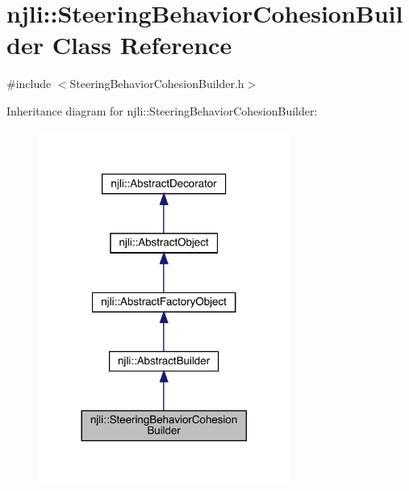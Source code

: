 \hypertarget{classnjli_1_1_steering_behavior_cohesion_builder}{}\section{njli\+:\+:Steering\+Behavior\+Cohesion\+Builder Class Reference}
\label{classnjli_1_1_steering_behavior_cohesion_builder}


{\ttfamily \#include $<$Steering\+Behavior\+Cohesion\+Builder.\+h$>$}



Inheritance diagram for njli\+:\+:Steering\+Behavior\+Cohesion\+Builder\+:\nopagebreak
\begin{figure}[H]
\begin{center}
\leavevmode
\includegraphics[width=233pt]{classnjli_1_1_steering_behavior_cohesion_builder__inherit__graph}
\end{center}
\end{figure}


